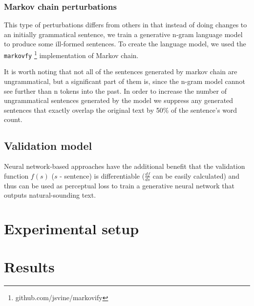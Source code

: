 \documentclass[11pt,a4paper]{article}
\begin{document}
\subsubsection{Markov chain perturbations}

This type of perturbations differs from others in that instead of doing changes to an initially grammatical sentence, we train a generative n-gram language model to produce some ill-formed sentences. To create the language model, we used the \texttt{markovfy} \footnote{github.com/jsvine/markovify} implementation of Markov chain.

It is worth noting that not all of the sentences generated by markov chain are ungrammatical, but a significant part of them is, since the n-gram model cannot see further than n tokens into the past. In order to increase the number of ungrammatical sentences generated by the model we suppress any generated sentences that exactly overlap the original text by 50\% of the sentence's word count.

\subsection{Validation model}

Neural network-based approaches have the additional benefit that the validation function $f(s)$ ($s$ - sentence) is differentiable ($\frac{df}{ds}$ can be easily calculated) and thus can be used as perceptual loss \cite{perceptualloss} to train a generative neural network that outputs natural-sounding text.

\section{Experimental setup}
\label{sec:setup}

\section{Results}
\label{sec:results}


\end{document}
